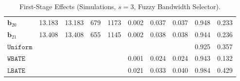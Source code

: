 \documentclass[10pt]{article}
\newcommand{\bb}{\mathbf{b}}
\begin{document}
\begin{table}[p]
\begin{tabular}{lccccrrrrr}
$\bb_{20}$ & 13.183 & 13.183 & 679 & 1173 & 0.002 & 0.037 & 0.037 & 0.948 & 0.233 \\
$\bb_{21}$ & 13.408 & 13.408 & 655 & 1145 & 0.002 & 0.038 & 0.038 & 0.944 & 0.236 \\
\midrule
$\mathtt{Uniform}$ &  &  &  &  &  &  &  & 0.925 & 0.357 \\
\midrule
$\mathtt{WBATE}$ &  &  &  &  & 0.001 & 0.024 & 0.024 & 0.943 & 0.132 \\
\midrule
$\mathtt{LBATE}$ &  &  &  &  & 0.021 & 0.033 & 0.040 & 0.984 & 0.429 \\
\bottomrule\bottomrule
\end{tabular}

    \caption{First-Stage Effects (Simulations, $s=3$, Fuzzy Bandwidth Selector).}
    \label{tab:sa-simuls-fs-s3-bwmain}
\end{table}
\end{document}

